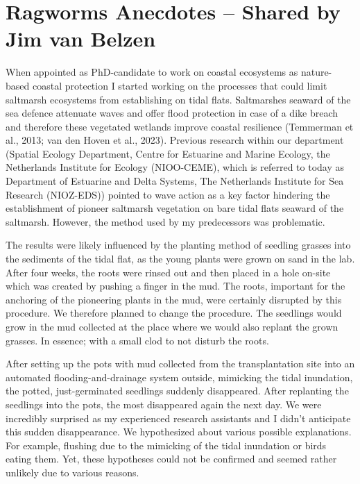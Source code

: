 \documentclass[authordate, empirical]{jote-new-article}
\author[1]{\mbox{Jim van Belzen\orcid{0000-0003-2099-1545}}}
\affil[1]{Wageningen Marine Research (WMR) \& Department of Estuarine and Delta Systems (EDS), Royal Netherlands Institute for Sea Research (NIOZ)}
\begin{document}
\begin{frontmatter}
  \maketitle
  \begin{abstract}
    \printabstracttext
  \end{abstract}
\end{frontmatter}


	\section{Ragworms Anecdotes -- Shared by Jim van Belzen}



	When appointed as PhD-candidate to work on coastal ecosystems as nature-based coastal protection I started working on the processes that could limit saltmarsh ecosystems from establishing on tidal flats. Saltmarshes seaward of the sea defence attenuate waves and offer flood protection in case of a dike breach and therefore these vegetated wetlands improve coastal resilience (Temmerman et al., 2013; van den Hoven et al., 2023). Previous research within our department (Spatial Ecology Department, Centre for Estuarine and Marine Ecology, the Netherlands Institute for Ecology (NIOO-CEME), which is referred to today as Department of Estuarine and Delta Systems, The Netherlands Institute for Sea Research (NIOZ-EDS)) pointed to wave action as a key factor hindering the establishment of pioneer saltmarsh vegetation on bare tidal flats seaward of the saltmarsh. However, the method used by my predecessors was problematic.



	The results were likely influenced by the planting method of seedling grasses into the sediments of the tidal flat, as the young plants were grown on sand in the lab. After four weeks, the roots were rinsed out and then placed in a hole on-site which was created by pushing a finger in the mud. The roots, important for the anchoring of the pioneering plants in the mud, were certainly disrupted by this procedure. We therefore planned to change the procedure. The seedlings would grow in the mud collected at the place where we would also replant the grown grasses. In essence; with a small clod to not disturb the roots.



	After setting up the pots with mud collected from the transplantation site into an automated flooding-and-drainage system outside, mimicking the tidal inundation, the potted, just-germinated seedlings suddenly disappeared. After replanting the seedlings into the pots, the most disappeared again the next day. We were incredibly surprised as my experienced research assistants and I didn't anticipate this sudden disappearance. We hypothesized about various possible explanations. For example, flushing due to the mimicking of the tidal inundation or birds eating them. Yet, these hypotheses could not be confirmed and seemed rather unlikely due to various reasons.
\end{document}
